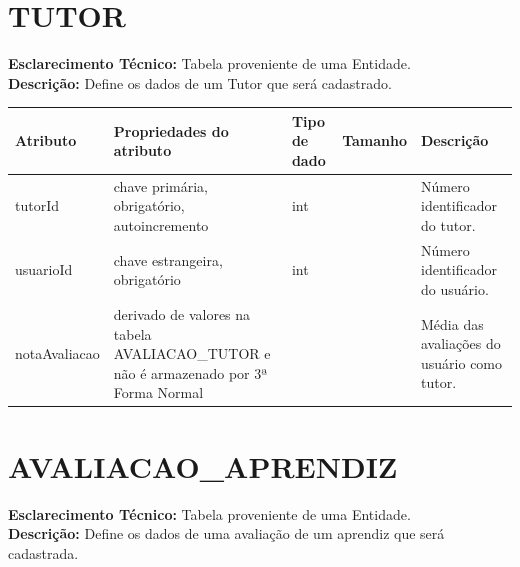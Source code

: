 \begin{apendicesenv}
\section*{TUTOR}
\noindent\textbf{Esclarecimento Técnico:} Tabela proveniente de uma Entidade. \\
\textbf{Descrição:} Define os dados de um Tutor que será cadastrado. 

\vspace{0.5cm}

\begin{xltabular}{\linewidth}{|l|>{\hsize}X|l|l|>{\hsize}X|}    
    \hline
        \textbf{Atributo} & \textbf{Propriedades do atributo} & \textbf{Tipo de dado} & \textbf{Tamanho} & \textbf{Descrição} \\
        \hline
        tutorId & chave primária, obrigatório, autoincremento & int & & Número identificador do tutor. \\
        \hline
        usuarioId & chave estrangeira, obrigatório & int & & Número identificador do usuário. \\
        \hline
    notaAvaliacao & derivado de valores na tabela AVALIACAO\_TUTOR e não é armazenado por 3ª Forma Normal &  &  & Média das avaliações do usuário como tutor. \\
        \hline
\end{xltabular}

\clearpage

\section*{AVALIACAO\_APRENDIZ}
\noindent\textbf{Esclarecimento Técnico:} Tabela proveniente de uma Entidade. \\
\textbf{Descrição:} Define os dados de uma avaliação de um aprendiz que será cadastrada.


\end{apendicesenv}

